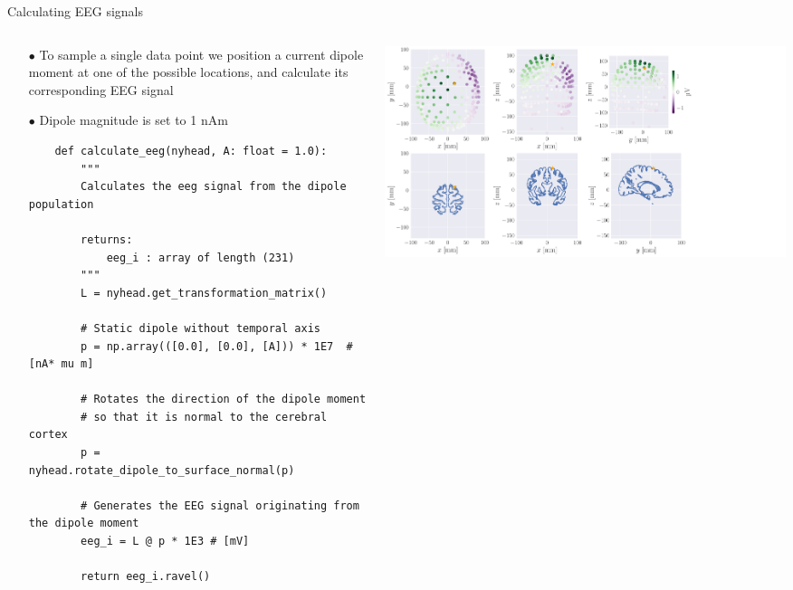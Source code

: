 \documentclass[aspectratio=169, 9pt]{beamer}
\begin{document}
\begin{frame}[fragile]{Calculating EEG signals}
    \begin{columns}
        \begin{column}{0.5\textwidth}
            \begin{itemize}
                \item[$\bullet$] To sample a single data point we position a current dipole moment at one of the possible locations, and calculate its corresponding EEG signal
                \item[$\bullet$] Dipole magnitude is set to 1 nAm
                {\scriptsize
                \begin{verbatim}
    def calculate_eeg(nyhead, A: float = 1.0):
        """
        Calculates the eeg signal from the dipole population

        returns:
            eeg_i : array of length (231)
        """
        L = nyhead.get_transformation_matrix()

        # Static dipole without temporal axis
        p = np.array(([0.0], [0.0], [A])) * 1E7  # [nA* mu m]

        # Rotates the direction of the dipole moment
        # so that it is normal to the cerebral cortex
        p = nyhead.rotate_dipole_to_surface_normal(p)

        # Generates the EEG signal originating from the dipole moment
        eeg_i = L @ p * 1E3 # [mV]

        return eeg_i.ravel()
                \end{verbatim}
                }
            \end{itemize}
        \end{column}
        \begin{column}{0.5\textwidth}
          \includegraphics[width=1.0\textwidth]{figures/simple_example.pdf}
        \end{column}
    \end{columns}
\end{frame}
\end{document}
